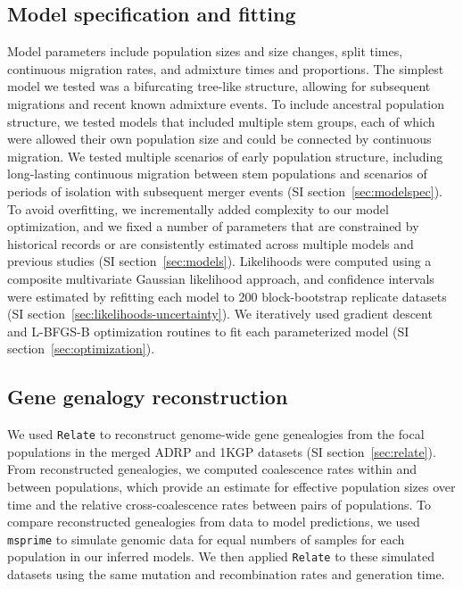 \documentclass[]{article}
\begin{document}
{\subsection*{Model specification and fitting}

Model parameters include population sizes and size changes, split times,
continuous migration rates, and admixture times and proportions. The simplest
model we tested was a bifurcating tree-like structure, allowing for subsequent
migrations and recent known admixture events. To include ancestral population
structure, we tested models that included multiple stem groups, each of which were
allowed their own population size and could be connected by continuous
migration. We tested multiple scenarios of early population structure,
including long-lasting continuous migration between stem populations and
scenarios of periods of isolation with subsequent merger events (SI
section~\ref{sec:modelspec}). To avoid overfitting, we incrementally added
complexity to our model optimization, and we fixed a number of parameters that
are constrained by historical records or are consistently estimated across
multiple models and previous studies (SI section~\ref{sec:models}). Likelihoods
were computed using a composite multivariate Gaussian likelihood approach, and
confidence intervals were estimated by refitting each model to 200
block-bootstrap replicate datasets (SI
section~\ref{sec:likelihoods-uncertainty}). We iteratively used gradient
descent and L-BFGS-B optimization routines to fit each parameterized model (SI
section~\ref{sec:optimization}).

\subsection*{Gene genalogy reconstruction}

We used \texttt{Relate} \citep{Speidel2019-nj} to reconstruct genome-wide gene
genealogies from the focal populations in the merged ADRP and 1KGP datasets
(SI section~\ref{sec:relate}). From reconstructed genealogies, we computed
coalescence rates within and between populations, which provide an estimate for
effective population sizes over time and the relative cross-coalescence rates
between pairs of populations. To compare reconstructed genealogies from data to
model predictions, we used \texttt{msprime}
\citep{Kelleher2016-lw,Baumdicker2022-mj} to simulate genomic data for equal
numbers of samples for each population in our inferred models. We then applied
\texttt{Relate} to these simulated datasets using the same mutation and
recombination rates and generation time.

}
\end{document}
